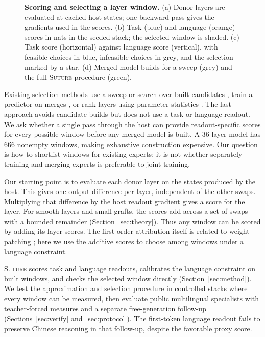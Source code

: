 \documentclass{article}
\theoremstyle{plain}
\theoremstyle{definition}
\theoremstyle{remark}
\begin{document}
\begin{figure}[t]
\centering
\resizebox{\textwidth}{!}{}
\caption{\textbf{Scoring and selecting a layer window.} (a) Donor layers are
evaluated at cached host states; one backward pass gives the gradients used in
the scores. (b) Task (blue) and language (orange) scores in nats in the seeded
stack; the selected window is shaded. (c) Task score (horizontal) against
language score (vertical), with feasible choices in
blue, infeasible choices in grey, and the selection marked by a star. (d)
Merged-model builds for a sweep (grey) and the full \textsc{Suture} procedure
(green).}
\label{fig:teaser}
\end{figure}

Existing selection methods use a sweep or search over built candidates
\citep{lasbordes2026rethinking,akiba2025evolutionary}, train a predictor on
merges \citep{akizuki2025surrogate}, or rank layers using parameter statistics
\citep{bandarkar2025layerswap,shin2026safetyswap}. The last approach avoids
candidate builds but does not use a task or language readout. We ask whether a
single pass through the host can provide readout-specific scores for every
possible window before any merged model is built. A 36-layer model has 666
nonempty windows, making exhaustive construction expensive. Our question is
how to shortlist windows for existing experts; it is not whether separately
training and merging experts is preferable to joint training.

Our starting point is to evaluate each donor layer on the states produced by
the host. This gives one output difference per layer, independent of the other
swaps. Multiplying that difference by the host readout gradient gives a score
for the layer. For smooth layers and small grafts, the scores add across a set
of swaps with a bounded remainder (Section~\ref{sec:theory}). Thus any window
can be scored by adding its layer scores. The first-order attribution itself
is related to weight patching \citep{sun2026weightpatching}; here we use the
additive scores to choose among windows under a language constraint.

\textsc{Suture} scores task and language readouts, calibrates the language
constraint on built windows, and checks the selected window directly
(Section~\ref{sec:method}). We test the approximation and selection procedure
in controlled stacks where every window can be measured, then evaluate public
multilingual specialists with teacher-forced measures and a separate
free-generation follow-up (Sections~\ref{sec:verify} and~\ref{sec:protocol}).
The first-token language readout fails to preserve Chinese reasoning in that
follow-up, despite the favorable proxy score.
\end{document}
